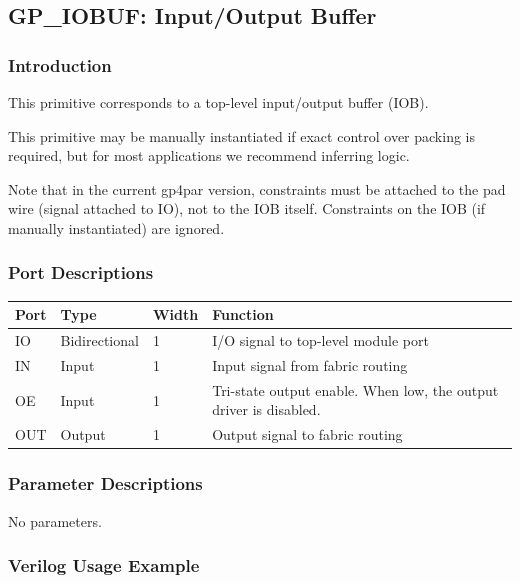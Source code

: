 \documentclass{article}
\begin{document}

\pagebreak
\subsection{GP\_IOBUF: Input/Output Buffer}

\subsubsection{Introduction}
This primitive corresponds to a top-level input/output buffer (IOB).

This primitive may be manually instantiated if exact control over packing is required, but for most applications we 
recommend inferring logic.

Note that in the current gp4par version, constraints must be attached to the pad wire (signal attached to IO), not 
to the IOB itself. Constraints on the IOB (if manually instantiated) are ignored.

\subsubsection{Port Descriptions}

\begin{tabularx}{4in}{|l|l|l|X|}
\hline
{\bfseries Port} & {\bfseries Type} & {\bfseries Width} & {\bfseries Function} \\
\hline
IO & Bidirectional & 1 & I/O signal to top-level module port \\
\hline
IN & Input & 1 & Input signal from fabric routing \\
\hline
OE & Input & 1 & Tri-state output enable. When low, the output driver is disabled. \\
\hline
OUT & Output & 1 & Output signal to fabric routing \\
\hline
\end{tabularx}

\subsubsection{Parameter Descriptions}

No parameters.

\pagebreak
\subsubsection{Verilog Usage Example}
\end{document}
